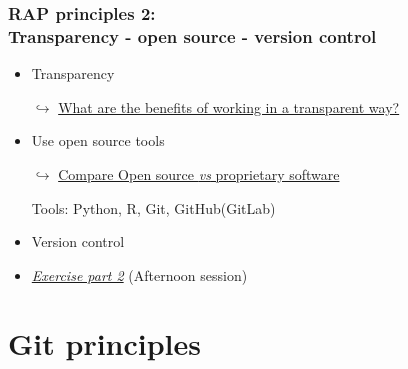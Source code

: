 \documentclass[xcolor=x11names,compress]{beamer}
\renewcommand{\(}{\begin{columns}}
\renewcommand{\)}{\end{columns}}
\newcommand{\<}[1]{\begin{column}{#1}}
\renewcommand{\>}{\end{column}}
\begin{document}
\begin{frame}[<+->]
   \frametitle{RAP principles 2:  \\Transparency - open source - version control }
   \pause
    \begin{itemize}[<+->]
      \item Transparency
     \item[$\hookrightarrow$]\href{https://sergegoussev.github.io/ESCAP_RAP_class/docs/teaching_materials/sept_18/sept_18_session.html\#principle-3-transparency}{What are the benefits of working in a transparent way? }
     \item Use open source tools
      \item[$\hookrightarrow$]\href{https://sergegoussev.github.io/ESCAP_RAP_class/docs/teaching_materials/sept_18/sept_18_session.html\#practical-set-two}{Compare Open source \emph{vs} proprietary software }
     \item[Tools:] Python, R, Git, GitHub(GitLab)
     \item Version control
     \item \href{https://sergegoussev.github.io/ESCAP_RAP_class/docs/teaching_materials/sept_18/sept_18_session.html\#excercize-1}{\emph{Exercise part 2}} (Afternoon session)
    \end{itemize}
\end{frame}

\section{Git principles}
\end{document}
